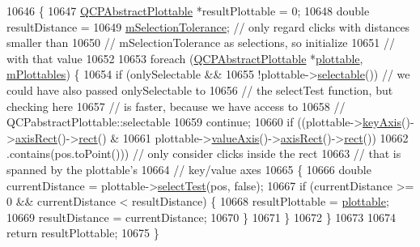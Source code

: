 \begin{DoxyCode}
10646                                                                           \{
10647   \hyperlink{class_q_c_p_abstract_plottable}{QCPAbstractPlottable} *resultPlottable = 0;
10648   \textcolor{keywordtype}{double} resultDistance =
10649       \hyperlink{class_q_custom_plot_abc36e12dd0482117ad810a800c847722}{mSelectionTolerance}; \textcolor{comment}{// only regard clicks with distances smaller than}
10650                            \textcolor{comment}{// mSelectionTolerance as selections, so initialize}
10651                            \textcolor{comment}{// with that value}
10652 
10653   \textcolor{keywordflow}{foreach} (\hyperlink{class_q_c_p_abstract_plottable}{QCPAbstractPlottable} *\hyperlink{class_q_custom_plot_adea38bdc660da9412ba69fb939031567}{plottable}, 
      \hyperlink{class_q_custom_plot_a4b6c694fbdb2f201626f71eff2d1694e}{mPlottables}) \{
10654     \textcolor{keywordflow}{if} (onlySelectable &&
10655         !plottable->\hyperlink{class_q_c_p_abstract_plottable_af895574da1ec0d050711b6c9deda296a}{selectable}()) \textcolor{comment}{// we could have also passed onlySelectable to}
10656                                   \textcolor{comment}{// the selectTest function, but checking here}
10657                                   \textcolor{comment}{// is faster, because we have access to}
10658                                   \textcolor{comment}{// QCPabstractPlottable::selectable}
10659       \textcolor{keywordflow}{continue};
10660     \textcolor{keywordflow}{if} ((plottable->\hyperlink{class_q_c_p_abstract_plottable_a72c7a09c22963f2c943f07112b311103}{keyAxis}()->\hyperlink{class_q_c_p_axis_aada3102af43b029e3879bcbf2bddfabb}{axisRect}()->\hyperlink{class_q_c_p_layout_element_affdfea003469aac3d0fac5f4e06171bc}{rect}() &
10661          plottable->\hyperlink{class_q_c_p_abstract_plottable_a3106f9d34d330a6097a8ec5905e5b519}{valueAxis}()->\hyperlink{class_q_c_p_axis_aada3102af43b029e3879bcbf2bddfabb}{axisRect}()->\hyperlink{class_q_c_p_layout_element_affdfea003469aac3d0fac5f4e06171bc}{rect}())
10662             .contains(pos.toPoint())) \textcolor{comment}{// only consider clicks inside the rect}
10663                                       \textcolor{comment}{// that is spanned by the plottable's}
10664                                       \textcolor{comment}{// key/value axes}
10665     \{
10666       \textcolor{keywordtype}{double} currentDistance = plottable->\hyperlink{class_q_c_p_abstract_plottable_a38efe9641d972992a3d44204bc80ec1d}{selectTest}(pos, \textcolor{keyword}{false});
10667       \textcolor{keywordflow}{if} (currentDistance >= 0 && currentDistance < resultDistance) \{
10668         resultPlottable = \hyperlink{class_q_custom_plot_adea38bdc660da9412ba69fb939031567}{plottable};
10669         resultDistance = currentDistance;
10670       \}
10671     \}
10672   \}
10673 
10674   \textcolor{keywordflow}{return} resultPlottable;
10675 \}
\end{DoxyCode}


